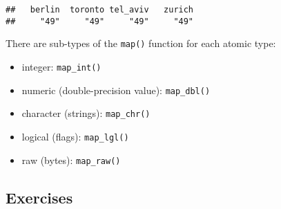 \documentclass[]{book}
\newenvironment{Shaded}{\begin{snugshade}}{\end{snugshade}}
\newcommand{\KeywordTok}[1]{\textcolor[rgb]{0.13,0.29,0.53}{\textbf{#1}}}
\newcommand{\NormalTok}[1]{#1}
\newcommand{\OperatorTok}[1]{\textcolor[rgb]{0.81,0.36,0.00}{\textbf{#1}}}
\newcommand{\StringTok}[1]{\textcolor[rgb]{0.31,0.60,0.02}{#1}}
\begin{document}
\begin{Shaded}
\end{Shaded}

\begin{verbatim}
##   berlin  toronto tel_aviv   zurich 
##     "49"     "49"     "49"     "49"
\end{verbatim}

There are sub-types of the \texttt{map()} function for each atomic type:

\begin{itemize}
\item
  integer: \texttt{map\_int()}
\item
  numeric (double-precision value): \texttt{map\_dbl()}
\item
  character (strings): \texttt{map\_chr()}
\item
  logical (flags): \texttt{map\_lgl()}
\item
  raw (bytes): \texttt{map\_raw()}
\end{itemize}

\hypertarget{exercises-12}{%
\subsection{Exercises}\label{exercises-12}}
\end{document}
